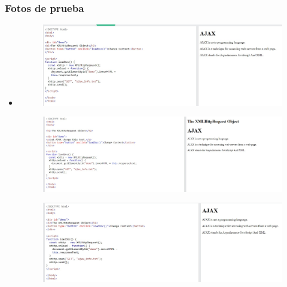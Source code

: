 \documentclass{article}
\begin{document}
	\subsubsection{Fotos de prueba}
	\begin{itemize}
		\item \begin{figure}[H]
			\centering
			\includegraphics[width=1.0\textwidth,keepaspectratio]{img/A1.jpg}
		\end{figure}

		\begin{figure}[H]
			\centering
			\includegraphics[width=1.0\textwidth,keepaspectratio]{img/A2.jpg}
		\end{figure}

		\begin{figure}[H]
			\centering
			\includegraphics[width=1.0\textwidth,keepaspectratio]{img/A3.jpg}
		\end{figure}


\end{itemize}
\end{document}
